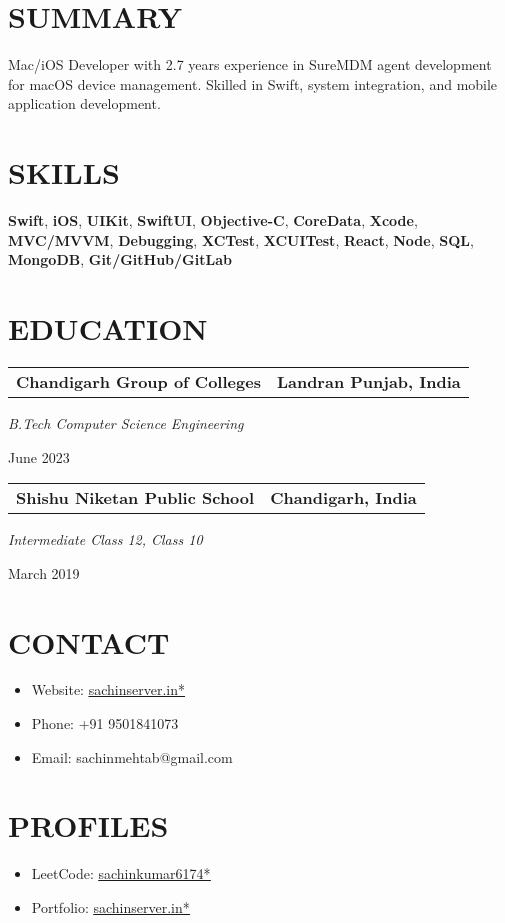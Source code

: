 \documentclass[11pt,a4paper]{moderncv}
\let\oldhref\href
\renewcommand{\href}[2]{\oldhref{#1}{\underline{#2}}}
\newcommand*{\educationentry}[4][0.5mm]{
    \begin{tabularx}{\textwidth}{LR}
        {\bfseries #3} & {\bfseries #4} \\
    \end{tabularx}
    {\itshape #2}
    \par\addvspace{#1}
}
\begin{document}
\begin{minipage}[t]{0.35\textwidth}
\section{SUMMARY}
Mac/iOS Developer with 2.7 years experience in SureMDM agent development for macOS device management. Skilled in Swift, system integration, and mobile application development.

\section{SKILLS}
\textbf{Swift}, \textbf{iOS}, \textbf{UIKit}, \textbf{SwiftUI}, \textbf{Objective-C}, \textbf{CoreData}, \textbf{Xcode}, \textbf{MVC/MVVM}, \textbf{Debugging}, \textbf{XCTest}, \textbf{XCUITest}, \textbf{React}, \textbf{Node}, \textbf{SQL}, \textbf{MongoDB}, \textbf{Git/GitHub/GitLab}

\section{EDUCATION}
\educationentry{B.Tech Computer Science Engineering}{Chandigarh Group of Colleges}{Landran Punjab, India}{June 2023}
\par
\vspace{3.0mm}
\educationentry{Intermediate Class 12, Class 10}{Shishu Niketan Public School}{Chandigarh, India}{March 2019}

\section{CONTACT}
\begin{itemize}
    \item Website: \href{https://www.sachinserver.in}{sachinserver.in*}
    \item Phone: +91 9501841073
    \item Email: sachinmehtab@gmail.com
\end{itemize}

\section{PROFILES}
\begin{itemize}
    \item LeetCode: \href{https://leetcode.com/u/sachinkumar6174/}{sachinkumar6174*}
    \item Portfolio: \href{https://sachinserver.in/}{sachinserver.in*}
\end{itemize}
\end{minipage}
\end{document}
